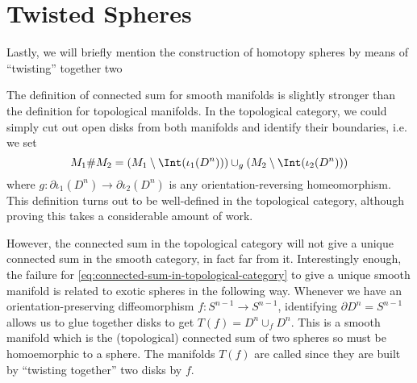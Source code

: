 \section{Twisted Spheres}\label{sec:twisted-spheres}
Lastly, we will briefly mention the construction of homotopy spheres by means of ``twisting'' together two 


	The definition of connected sum for smooth manifolds is slightly stronger than the definition for topological manifolds. In the topological category, we could simply cut out open disks from both manifolds and identify their boundaries, i.e. we set
	\begin{equation}\label{eq:connected-sum-in-topological-category}
		M_1\# M_2 = (M_1\setminus \Int(\iota_1(D^n)))\cup_g (M_2\setminus \Int(\iota_2(D^n)))
	\end{equation}
	where $g : \partial \iota_1(D^n) \to \partial \iota_2(D^n)$ is any orientation-reversing homeomorphism. This definition turns out to be well-defined in the topological category, although proving this takes a considerable amount of work. 

	However, the connected sum in the topological category will not give a unique connected sum in the smooth category, in fact far from it. Interestingly enough, the failure for \cref{eq:connected-sum-in-topological-category} to give a unique smooth manifold is related to exotic spheres in the following way. Whenever we have an orientation-preserving diffeomorphism $f: S^{n-1}\to S^{n-1}$, identifying $\partial D^n = S^{n-1}$ allows us to glue together disks to get $T(f)=D^n\cup_f D^n$. This is a smooth manifold which is the (topological) connected sum of two spheres so must be homoemorphic to a sphere. The manifolds $T(f)$ are called  since they are built by ``twisting together'' two disks by $f$. 

